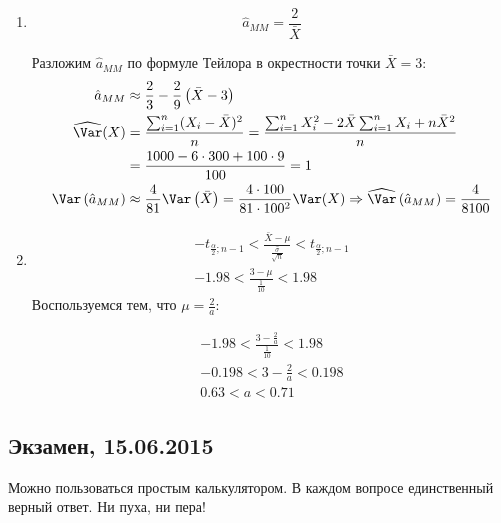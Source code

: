 \begin{enumerate}
\begin{enumerate}
\item
\[
\hat{a}_{MM}=\frac{2}{\bar{X}}
\]

Разложим $\hat{a}_{MM}$ по формуле Тейлора в окрестности точки $\bar{X}=3$:
\begin{align*}
\hat{a}_{MM} &\approx \frac{2}{3} - \frac{2}{9}\left(\bar{X}-3\right) \\
\widehat{\Var}(X) &= \frac{\sum^n_{i=1}(X_i-\bar{X})^2}{n}=\frac{\sum^n_{i=1}X_i^2-2\bar{X}\sum^n_{i=1}X_i+n\bar{X}^2}{n} \\
&= \frac{1000 - 6\cdot300 + 100\cdot9}{100} = 1 \\
\Var\left(\hat{a}_{MM}\right) &\approx \frac{4}{81}\Var\left(\bar{X}\right) = \frac{4\cdot100}{81\cdot100^2} \Var(X)\Rightarrow \widehat{\Var}\left(\hat{a}_{MM}\right) = \frac{4}{8100}
\end{align*}
\item
\begin{align*}
-t_{\frac{\alpha}{2};n-1}<\frac{\bar{X}-\mu}{\frac{\hat{\sigma}}{\sqrt{n}}}<t_{\frac{\alpha}{2};n-1} \\
-1.98<\frac{3-\mu}{\frac{1}{10}}<1.98
\end{align*}
Воспользуемся тем, что $\mu=\frac{2}{a}$:

\begin{align*}
-1.98<\frac{3-\frac{2}{a}}{\frac{1}{10}}<1.98 \\
-0.198<3-\frac{2}{a}<0.198 \\
0.63<a<0.71
\end{align*}

\end{enumerate}
\end{enumerate}




\subsection{Экзамен, 15.06.2015}



\vspace{3ex}

Можно пользоваться простым калькулятором.  В каждом вопросе единственный верный ответ. Ни пуха, ни пера!

\vspace{3ex}



